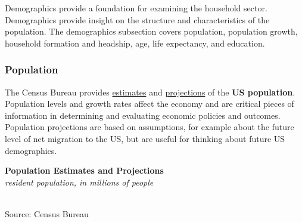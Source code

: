 \documentclass{report}
\makeatletter
\newcommand{\tbllink}[1]{\href{https://raw.githubusercontent.com/bdecon/US-chartbook/master/chartbook/data/#1}{\faTable}}
\newcommand*\short[1]{\expandafter\@gobbletwo\number\numexpr#1\relax}
\newcommand{\absnode}[3]{\node[below right, align=left] at (axis cs: #1,#2) {#3};}
\newcommand{\dateaxisticks}{
		date coordinates in=x, axis line style={draw=none},
		xmax={2023-02-15},
		max space between ticks=40,	    
		xtick={{1990-01-01}, {1992-01-01}, {1994-01-01}, 
			{1996-01-01}, {1998-01-01}, {2000-01-01}, 
			{2002-01-01}, {2004-01-01}, {2006-01-01},
			{2008-01-01}, {2010-01-01}, {2012-01-01}, {2014-01-01},
		    {2016-01-01}, {2018-01-01}, {2020-01-01}, {2022-01-01}, 
		    {2024-01-01}, {2026-01-01}},
		minor xtick={{1989-01-01}, {1991-01-01}, {1993-01-01},
			{1995-01-01}, {1997-01-01}, {1999-01-01}, 
			{2001-01-01}, {2003-01-01}, {2005-01-01}, {2007-01-01},
		    {2009-01-01}, {2011-01-01}, {2013-01-01}, {2015-01-01},
		    {2017-01-01}, {2019-01-01}, {2021-01-01}, {2023-01-01}, 
		    {2025-01-01}, {2027-01-01}},
		enlarge y limits={0.06}, enlarge x limits={0.01},
		}
\newcommand{\bbar}[2]{extra #1 ticks = {{#2}}, extra #1 tick labels = ,
		extra #1 tick style = {grid=major, grid style={thick, black!25}},}
\newcommand{\thickline}[4]{\addplot[ultra thick, no markers, color=#1] 
		table [x=#2, y=#3, col sep=comma] {#4};	}
\newcommand{\rbars}{
		\fill[color=black!10] (axis cs:{1990-07-01},\pgfkeysvalueof{/pgfplots/ymin}) rectangle 
			(axis cs:{1991-03-01}, \pgfkeysvalueof{/pgfplots/ymax});
		\fill[color=black!10] (axis cs:{2007-12-01},\pgfkeysvalueof{/pgfplots/ymin}) rectangle 
			(axis cs:{2009-07-01}, \pgfkeysvalueof{/pgfplots/ymax});
		\fill[color=black!10] (axis cs:{2001-03-01},\pgfkeysvalueof{/pgfplots/ymin}) rectangle 
			(axis cs:{2001-11-01}, \pgfkeysvalueof{/pgfplots/ymax});
		\fill[color=black!10] (axis cs:{2020-02-01},\pgfkeysvalueof{/pgfplots/ymin}) rectangle 
			(axis cs:{2020-05-01}, \pgfkeysvalueof{/pgfplots/ymax});}
\makeatother
\begin{document}
{\begin{minipage}{0.76\textwidth}
\small Demographics provide a foundation for examining the household sector. Demographics provide insight on the structure and characteristics of the population. The demographics subsection covers population, population growth, household formation and headship, age, life expectancy, and education.

\subsubsection*{Population}
\small The Census Bureau provides \href{https://www.census.gov/programs-surveys/popest.html}{estimates} and \href{https://www.census.gov/programs-surveys/popproj.html}{projections} of the \textbf{US population}. Population levels and growth rates affect the economy and are critical pieces of information in determining and evaluating economic policies and outcomes. Population projections are based on assumptions, for example about the future level of net migration to the US, but are useful for thinking about future US demographics.


\vspace{1mm}

\normalsize \textbf{Population Estimates and Projections}\\
\footnotesize{\textit{resident population, in millions of people}}\\
\hspace*{-2mm} \\
\footnotesize{Source: Census Bureau} \hfill \tbllink{pop_est.csv}
\vspace{2mm}


\end{minipage}}
\end{document}
